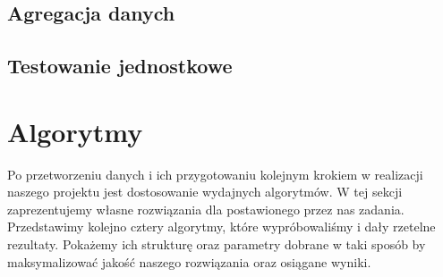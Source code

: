         \subsection{Agregacja danych}
        \subsection{Testowanie jednostkowe}
    \section{Algorytmy}
    Po przetworzeniu danych i ich przygotowaniu kolejnym krokiem w realizacji naszego projektu jest dostosowanie wydajnych algorytmów. W tej sekcji zaprezentujemy własne rozwiązania dla postawionego przez nas zadania. Przedstawimy kolejno cztery algorytmy, które wypróbowaliśmy i dały rzetelne rezultaty. Pokażemy ich strukturę oraz parametry dobrane w taki sposób by maksymalizować jakość naszego rozwiązania oraz osiągane wyniki.
